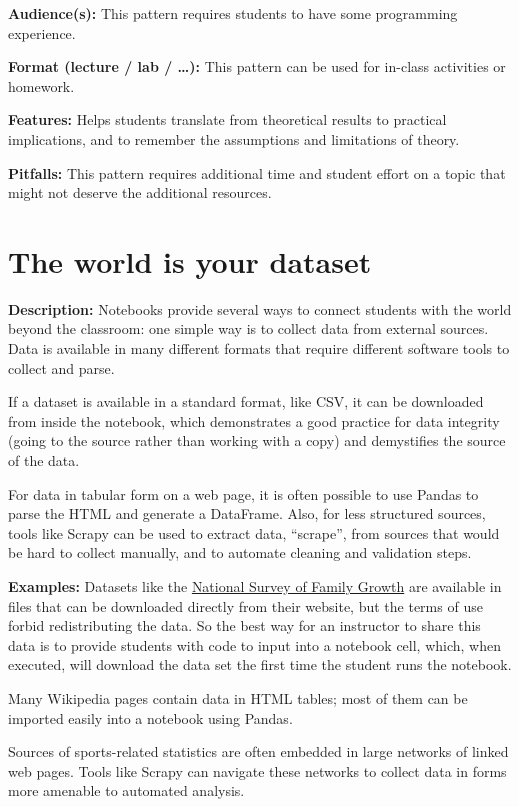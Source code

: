 \documentclass[]{book}
\begin{document}
\textbf{Audience(s):} This pattern requires students to have some
programming experience.

\textbf{Format (lecture / lab / \ldots{}):} This pattern can be used for
in-class activities or homework.

\textbf{Features:} Helps students translate from theoretical results to
practical implications, and to remember the assumptions and limitations
of theory.

\textbf{Pitfalls:} This pattern requires additional time and student
effort on a topic that might not deserve the additional resources.

\section{The world is your dataset}\label{the-world-is-your-dataset}

\textbf{Description:} Notebooks provide several ways to connect students
with the world beyond the classroom: one simple way is to collect data
from external sources. Data is available in many different formats that
require different software tools to collect and parse.

If a dataset is available in a standard format, like CSV, it can be
downloaded from inside the notebook, which demonstrates a good practice
for data integrity (going to the source rather than working with a copy)
and demystifies the source of the data.

For data in tabular form on a web page, it is often possible to use
Pandas to parse the HTML and generate a DataFrame. Also, for less
structured sources, tools like Scrapy can be used to extract data,
``scrape'', from sources that would be hard to collect manually, and to
automate cleaning and validation steps.

\textbf{Examples:} Datasets like the
\href{https://www.cdc.gov/nchs/nsfg/index.htm}{National Survey of Family
Growth} are available in files that can be downloaded directly from
their website, but the terms of use forbid redistributing the data. So
the best way for an instructor to share this data is to provide students
with code to input into a notebook cell, which, when executed, will
download the data set the first time the student runs the notebook.

Many Wikipedia pages contain data in HTML tables; most of them can be
imported easily into a notebook using Pandas.

Sources of sports-related statistics are often embedded in large
networks of linked web pages. Tools like Scrapy can navigate these
networks to collect data in forms more amenable to automated analysis.
\end{document}
